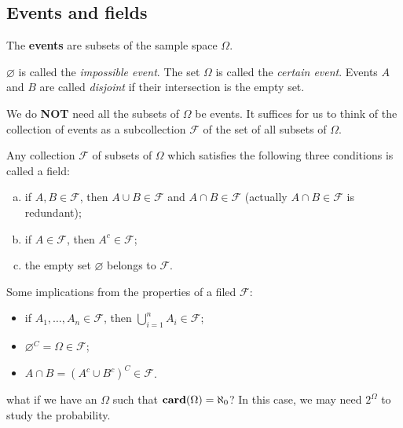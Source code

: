 \subsection{Events and fields}
\begin{definition}
The \textbf{events} are subsets of the sample space $\Omega$. 
\end{definition}

\begin{remark}
$\varnothing$ is called the \emph{impossible event}. The set $\Omega$ is called the \emph{certain event}. Events $A$ and $B$ are called \emph{disjoint} if their intersection is the empty set.
\end{remark}

We do \textbf{NOT} need all the subsets of $\Omega$ be events. It suffices for us to think of the collection of events as a subcollection $\mathcal{F}$ of the set of all subsets of $\Omega$.
\begin{definition}
Any collection $\mathcal{F}$ of subsets of $\Omega$ which satisfies the following three conditions is called a field:
\begin{enumerate}[(a)]
    \item if $A, B \in \mathcal{F}$, then $A \cup B \in \mathcal{F}$ and $A \cap B \in \mathcal{F}$ (actually $A\cap B \in \mathcal{F}$ is redundant); 
    \item if $A \in \mathcal{F}$, then $A^c \in \mathcal{F}$;
    \item the empty set $\varnothing$ belongs to $\mathcal{F}$.
\end{enumerate}
\end{definition}

\begin{remark}
Some implications from the properties of a filed $\mathcal{F}$:
\begin{itemize}
    \item if $A_1, \dots, A_n \in \mathcal{F}$, then $\bigcup_{i=1}^n A_i \in \mathcal{F}$;
    \item $\varnothing^C = \Omega \in \mathcal{F}$;
    \item $A \cap B = (A^c \cup B^c)^C \in \mathcal{F}$.
\end{itemize}
\end{remark}

\begin{question}
what if we have an $\Omega$ such that $\mathbf{card}(\Omega) = \aleph_0$? In this case, we may need $2^\Omega$ to study the probability. 
\end{question}


